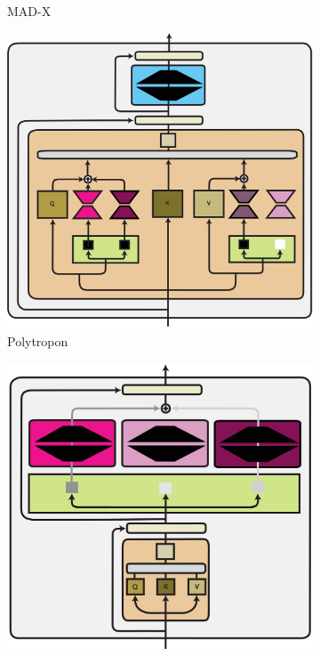 \documentclass[10pt]{article} %
\begin{document}
\begin{figure}[t]
\begin{subfigure}[b]{.15\linewidth}
        \caption{MAD-X }
        \label{fig:CaseStudy:MADX}
    \end{subfigure}
    \hspace{.5em}
    \begin{subfigure}[b]{.35\linewidth}
    \centering
    \vspace{3em}
        \includegraphics[width=.99\linewidth]{img/Polytropon.pdf}  
        \caption{Polytropon}
    \label{fig:CaseStudy:Polytropon}
    \end{subfigure}
    \hspace{.5em}
    \begin{subfigure}[b]{.35\linewidth}
    \centering
        \includegraphics[width=.99\linewidth]{img/moe.pdf}  

\end{subfigure}
\end{figure}
\end{document}
